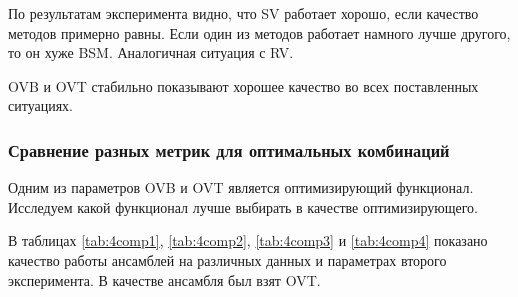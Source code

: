 \documentclass[14pt]{extarticle}
\begin{document}
\begin{table}[H]
\caption{Набор данных Movie Lens 1m}
\label{tab:4comp4}
\end{table}


По результатам эксперимента видно, что SV работает хорошо, если качество методов примерно равны. Если один из методов работает намного лучше другого, то он хуже BSM. Аналогичная ситуация с RV.

OVB и OVT стабильно показывают хорошее качество во всех поставленных ситуациях.

\subsubsection{Сравнение разных метрик для оптимальных комбинаций}
Одним из параметров OVB и OVT является оптимизирующий функционал. Исследуем какой функционал лучше выбирать в качестве оптимизирующего.

В таблицах \ref{tab:4comp1}, \ref{tab:4comp2}, \ref{tab:4comp3} и \ref{tab:4comp4} показано качество работы ансамблей на различных данных и параметрах второго эксперимента. В качестве ансамбля был взят OVT. 
\end{document}
